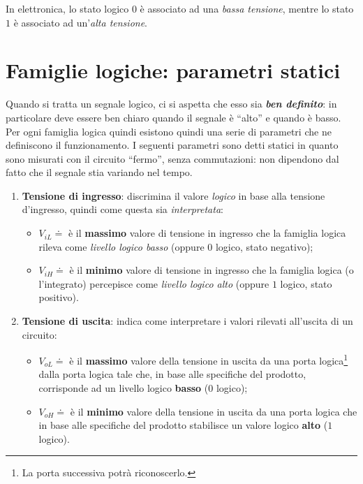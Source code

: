 \documentclass[
]{book}
\providecommand{\tightlist}{%
  \setlength{\itemsep}{0pt}\setlength{\parskip}{0pt}}
\begin{document}
In elettronica, lo stato logico \(0\) è associato ad una \emph{bassa
tensione}, mentre lo stato \(1\) è associato ad un'\emph{alta tensione}.

\section{Famiglie logiche: parametri
statici}\label{famiglie-logiche-parametri-statici}

Quando si tratta un segnale logico, ci si aspetta che esso sia
\textbf{\emph{ben definito}}: in particolare deve essere ben chiaro
quando il segnale è ``alto'' e quando è basso. Per ogni famiglia logica
quindi esistono quindi una serie di parametri che ne definiscono il
funzionamento. I seguenti parametri sono detti statici in quanto sono
misurati con il circuito ``fermo'', senza commutazioni: non dipendono
dal fatto che il segnale stia variando nel tempo.

\begin{enumerate}
\def\labelenumi{\arabic{enumi})}
\tightlist
\item
  \textbf{Tensione di ingresso}: discrimina il valore \emph{logico} in
  base alla tensione d'ingresso, quindi come questa sia
  \emph{interpretata}:

  \begin{itemize}
  \tightlist
  \item
    \(V_{iL} \doteq\) è il \textbf{massimo} valore di tensione in
    ingresso che la famiglia logica rileva come \emph{livello logico
    basso} (oppure \(0\) logico, stato negativo);
  \item
    \(V_{iH} \doteq\) è il \textbf{minimo} valore di tensione in
    ingresso che la famiglia logica (o l'integrato) percepisce come
    \emph{livello logico alto} (oppure \(1\) logico, stato positivo).
  \end{itemize}
\item
  \textbf{Tensione di uscita}: indica come interpretare i valori
  rilevati all'uscita di un circuito:

  \begin{itemize}
  \tightlist
  \item
    \(V_{oL} \doteq\) è il \textbf{massimo} valore della tensione in
    uscita da una porta logica\footnote{La porta successiva potrà
      riconoscerlo.} dalla porta logica tale che, in base alle
    specifiche del prodotto, corrisponde ad un livello logico
    \textbf{basso} (\(0\) logico);
  \item
    \(V_{oH} \doteq\) è il \textbf{minimo} valore della tensione in
    uscita da una porta logica che in base alle specifiche del prodotto
    stabilisce un valore logico \textbf{alto} (\(1\) logico).
  \end{itemize}
\end{enumerate}
\end{document}

